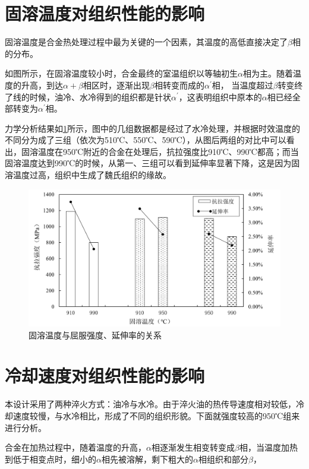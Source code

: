 \section{固溶温度对组织性能的影响}
固溶温度是\ti 合金热处理过程中最为关键的一个因素，其温度的高低直接决定了$\beta$相的分布。

如图所示，在固溶温度较小时，合金最终的室温组织以等轴初生$\alpha$相为主。随着温度的升高，到达$\alpha+\beta$相区时，逐渐出现$\beta$相转变而成的$\alpha^\prime$相，%
当温度超过$\beta $转变终了线的时候，油冷、水冷得到的组织都是针状$\alpha^\prime$，这表明组织中原本的$\alpha$相已经全部转变为$\alpha^\prime$相。

力学分析结果如\ref{fig:Gqy}所示，图中的几组数据都是经过了水冷处理，并根据时效温度的不同分为成了三组（依次为510℃、550℃、590℃），从图后两组的对比中可以看出，固溶温度在950℃附近的合金在处理后，抗拉强度比910℃、990℃都高；而当固溶温度达到990℃的时候，从第一、三组可以看到延伸率显著下降，这是因为固溶温度过高，组织中生成了魏氏组织的缘故。


\begin{figure}[h!]
	\centering
	\includegraphics[width=1\linewidth]{pic/固溶温度与屈服强度、延伸率的关系}
	\caption{固溶温度与屈服强度、延伸率的关系}
	\label{fig:Gqy}
\end{figure}

\section{冷却速度对组织性能的影响}
本设计采用了两种淬火方式：油冷与水冷。由于淬火油的热传导速度相对较低，冷却速度较慢，与水冷相比，形成了不同的组织形貌。下面就强度较高的950℃组来进行分析。

合金在加热过程中，随着温度的升高，$\alpha$相逐渐发生相变转变成$\beta$相，当温度加热到低于相变点时，细小的$\alpha$相先被溶解，剩下粗大的$\alpha$相组织和部分$\beta$，

